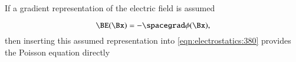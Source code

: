 %
%

If a gradient representation of the electric field is assumed

\begin{dmath}\label{eqn:electrostatics_electricPotential:561}
\BE(\Bx) = -\spacegrad \phi(\Bx),
\end{dmath}
then
inserting
this assumed representation into \cref{eqn:electrostatics:380} provides the
Poisson equation directly
